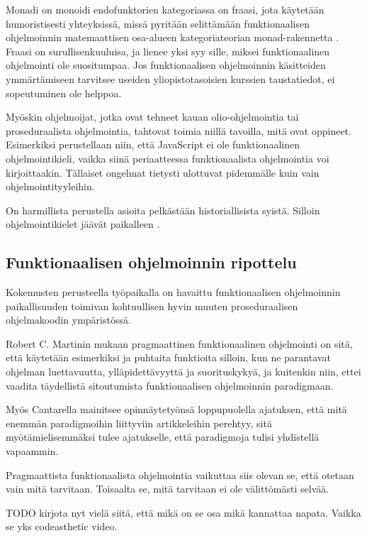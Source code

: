 Monadi on monoidi endofunktorien kategoriassa on fraasi, jota käytetään humoristisesti yhteyksissä, missä pyritään selittämään funktionaalisen ohjelmoinnin matemaattisen osa-alueen kategoriateorian \gls{monad}-rakennetta \cite{bartosz_category_for_progamers_10}. Fraasi on surullisenkuuluisa, ja lienee yksi syy sille, miksei funktionaalinen ohjelmointi ole suositumpaa. Jos funktionaalisen ohjelmoinnin käsitteiden ymmärtämiseen tarvitsee useiden yliopistotasoisien kurssien taustatiedot, ei sopeutuminen ole helppoa.

Myöskin ohjelmoijat, jotka ovat tehneet kauan olio-ohjelmointia tai proseduraalista ohjelmointia, tahtovat toimia niillä tavoilla, mitä ovat oppineet. Esimerkiksi perustellaan niin, että JavaScript ei ole funktionaalinen ohjelmointikieli, vaikka siinä periaatteessa funktionaalista ohjelmointia voi kirjoittaakin. Tällaiset ongelmat tietysti ulottuvat pidemmälle kuin vain ohjelmointityyleihin. \citep{is_reduce_bad}

On harmillista perustella asioita pelkästään historiallisista syistä. Silloin ohjelmointikielet jäävät paikalleen \cite{promises-spec-94}.

\subsection{Funktionaalisen ohjelmoinnin ripottelu}

Kokemusten perusteella työpaikalla on havaittu funktionaalisen ohjelmoinnin paikallisuuden toimivan kohtuullisen hyvin muuten proseduraalisen ohjelmakoodin ympäristössä.

Robert C. Martinin mukaan pragmaattinen funktionaalinen ohjelmointi on sitä, että käytetään esimerkiksi  ja puhtaita funktioita silloin, kun ne parantavat ohjelman luettavuutta, ylläpidettävyyttä ja suorituskykyä, ja kuitenkin niin, ettei vaadita täydellistä sitoutumista funktionaalisen ohjelmoinnin paradigmaan. \citep{martin2017pragmaticfp}

Myös Cantarella mainitsee opinnäytetyönsä loppupuolella ajatuksen, että mitä enemmän paradigmoihin liittyviin artikkeleihin perehtyy, sitä myötämielisemmäksi tulee ajatukselle, että paradigmoja tulisi yhdistellä vapaammin. \citep[45]{cantarella_fp_haitat}

Pragmaattista funktionaalista ohjelmointia vaikuttaa siis olevan se, että otetaan vain mitä tarvitaan. Toisaalta se, mitä tarvitaan ei ole välittömästi selvää.

TODO kirjota nyt vielä siitä, että mikä on se osa mikä kannattaa napata. Vaikka se yks codeasthetic video.

